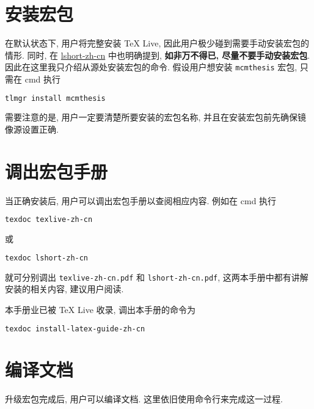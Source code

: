 \section{安装宏包}

在默认状态下, 用户将完整安装 \TeX{} Live, 因此用户极少碰到需要手动安装宏包的情形. 
同时, 在
\href{http://mirrors.ctan.org/info/lshort/chinese/lshort-zh-cn.pdf}{lshort-zh-cn}
中也明确提到, \textbf{如非万不得已, 尽量不要手动安装宏包}. 
因此在这里我只介绍从源处安装宏包的命令. 
假设用户想安装 \texttt{mcmthesis} 宏包, 只需在 \textsf{cmd} 执行
\begin{lstlisting}[language=bash]
  tlmgr install mcmthesis
\end{lstlisting}
需要注意的是, 用户一定要清楚所要安装的宏包名称, 并且在安装宏包前先确保镜像源设置正确.

\section{调出宏包手册}

当正确安装后,
用户可以调出宏包手册以查阅相应内容.
例如在 \textsf{cmd} 执行
\begin{lstlisting}[language=bash]
  texdoc texlive-zh-cn
\end{lstlisting}
或
\begin{lstlisting}[language=bash]
  texdoc lshort-zh-cn
\end{lstlisting}
就可分别调出 \texttt{texlive-zh-cn.pdf} 和 \texttt{lshort-zh-cn.pdf},
这两本手册中都有讲解安装的相关内容,
建议用户阅读.

本手册业已被 \TeX{} Live 收录,
调出本手册的命令为
\begin{lstlisting}[language=bash]
  texdoc install-latex-guide-zh-cn
\end{lstlisting}

\section{编译文档}\label{sec:windows:compile}

升级宏包完成后, 用户可以编译文档. 
这里依旧使用命令行来完成这一过程. 


